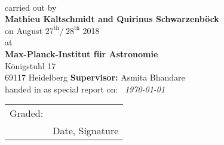 
\begin{titlepage}
	\begin{center}
		\makeatletter
		
		\thispagestyle{empty}
		
		\huge\textbf{\@title} \\
		\vfill
		\large carried out by \\
		\Large\textbf{Mathieu Kaltschmidt and 
			Quirinus Schwarzenböck} \\
		\vspace{2mm}
		\large{on August $27^{\text{th}} / \ 28^{\text{th}}$} 2018 \\
		\vfill 
		\large{at} \\
		\Large\textbf{Max-Planck-Institut für Astronomie} \\
				\vspace{2mm}
		\large Königstuhl 17\\
		69117 Heidelberg
		\vfill
		\Large
		\textbf{Supervisor:} Asmita Bhandare \\
		\vfill
	   handed in as special report on: \  \textit{\today} \\
	   \vfill
	   
	   \begin{tabular}{@{}p{.5in}p{4in}@{}}
			\vspace{-15pt}Graded: & \hspace{8pt}\hrulefill \\
			& \vspace{-13pt}\hspace{10pt}\normalsize Date, Signature \\
	   \end{tabular}
		\makeatother
	\end{center}
\blankpage
\end{titlepage}
